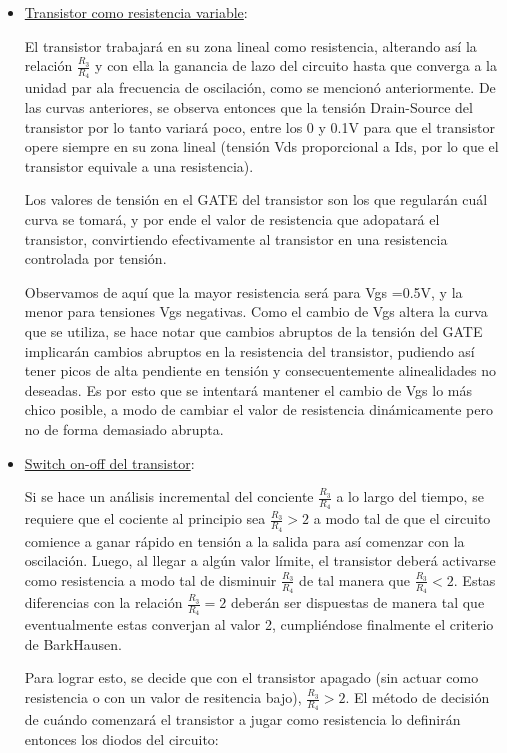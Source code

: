 \documentclass[../../tc_tp6_main.tex]{subfiles}
\begin{document}
\begin{itemize}
\item \underline{Transistor como resistencia variable}:\par
El transistor trabajará en su zona lineal como resistencia, alterando así la relación $\frac{R_3}{R_4}$ y con ella la ganancia de lazo del circuito hasta que converga a la unidad par ala frecuencia de oscilación, como se mencionó anteriormente. De las curvas anteriores, se observa entonces que la tensión Drain-Source del transistor por lo tanto variará poco, entre los 0 y 0.1V para que el transistor opere siempre en su zona lineal (tensión Vds proporcional a Ids, por lo que el transistor equivale a una resistencia). \par
Los valores de tensión en el GATE del transistor son los que regularán cuál curva se tomará, y por ende el valor de resistencia que adopatará el transistor, convirtiendo efectivamente al transistor en una resistencia controlada por tensión.\par
Observamos de aquí que la mayor resistencia será para Vgs =0.5V, y la menor para tensiones Vgs negativas. Como el cambio de Vgs altera la curva que se utiliza, se hace notar que cambios abruptos de la tensión del GATE implicarán cambios abruptos en la resistencia del transistor, pudiendo así tener picos de alta pendiente en tensión y consecuentemente alinealidades no deseadas. Es por esto que se intentará mantener el cambio de Vgs lo más chico posible, a modo de cambiar el valor de resistencia dinámicamente pero no de forma demasiado abrupta. \par
\item \underline{Switch on-off del transistor}:\par
Si se hace un análisis incremental del conciente $\frac{R_3}{R_4}$ a lo largo del tiempo, se requiere que el cociente al principio sea $\frac{R_3}{R_4} > 2$ a modo tal de que el circuito comience a ganar rápido en tensión a la salida para así comenzar con la oscilación. Luego, al llegar a algún valor límite, el transistor deberá activarse como resistencia a modo tal de disminuir  $\frac{R_3}{R_4} $ de tal manera que $\frac{R_3}{R_4} < 2$. Estas diferencias con la relación $\frac{R_3}{R_4} = 2$ deberán ser dispuestas de manera tal que eventualmente estas converjan al valor 2, cumpliéndose finalmente el criterio de BarkHausen.\par
Para lograr esto, se decide que con el transistor apagado (sin actuar como resistencia o con un valor de resitencia bajo), $\frac{R_3}{R_4} > 2$. El método de decisión de cuándo comenzará el transistor a jugar como resistencia lo definirán entonces los diodos del circuito: \par

\end{itemize}
\end{document}
